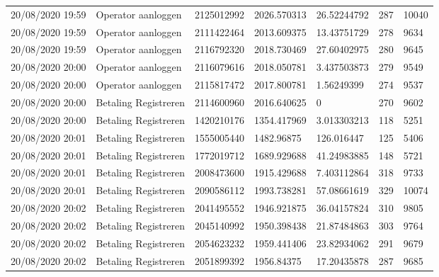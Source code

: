 \begin{tiny}
\begin{longtable}{lllllll}
    20/08/2020 19:59 & Operator aanloggen    & 2125012992        & 2026.570313 & 26.52244792           & 287              & 10040            \\
    20/08/2020 19:59 & Operator aanloggen    & 2111422464        & 2013.609375 & 13.43751729           & 278              & 9634             \\
    20/08/2020 19:59 & Operator aanloggen    & 2116792320        & 2018.730469 & 27.60402975           & 280              & 9645             \\
    20/08/2020 20:00 & Operator aanloggen    & 2116079616        & 2018.050781 & 3.437503873           & 279              & 9549             \\
    20/08/2020 20:00 & Operator aanloggen    & 2115817472        & 2017.800781 & 1.56249399            & 274              & 9537             \\
    20/08/2020 20:00 & Betaling Registreren  & 2114600960        & 2016.640625 & 0                     & 270              & 9602             \\
    20/08/2020 20:00 & Betaling Registreren  & 1420210176        & 1354.417969 & 3.013303213           & 118              & 5251             \\
    20/08/2020 20:01 & Betaling Registreren  & 1555005440        & 1482.96875  & 126.016447            & 125              & 5406             \\
    20/08/2020 20:01 & Betaling Registreren  & 1772019712        & 1689.929688 & 41.24983885           & 148              & 5721             \\
    20/08/2020 20:01 & Betaling Registreren  & 2008473600        & 1915.429688 & 7.403112864           & 318              & 9733             \\
    20/08/2020 20:01 & Betaling Registreren  & 2090586112        & 1993.738281 & 57.08661619           & 329              & 10074            \\
    20/08/2020 20:02 & Betaling Registreren  & 2041495552        & 1946.921875 & 36.04157824           & 310              & 9805             \\
    20/08/2020 20:02 & Betaling Registreren  & 2045140992        & 1950.398438 & 21.87484863           & 303              & 9764             \\
    20/08/2020 20:02 & Betaling Registreren  & 2054623232        & 1959.441406 & 23.82934062           & 291              & 9679             \\
    20/08/2020 20:02 & Betaling Registreren  & 2051899392        & 1956.84375  & 17.20435878           & 287              & 9685             \\

\end{longtable}
\end{tiny}
